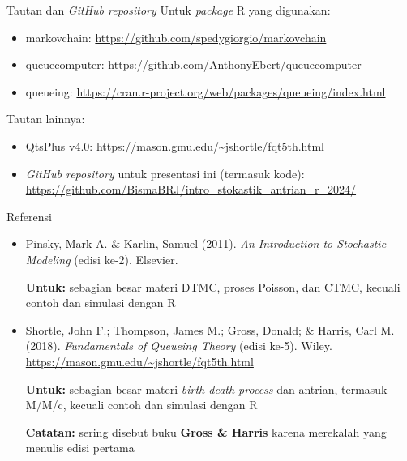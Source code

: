 \documentclass{beamer}
\begin{document}
\begin{frame}{Tautan dan \textit{GitHub repository}}
    Untuk \textit{package} R yang digunakan:
    \begin{itemize}
        \item markovchain: \url{https://github.com/spedygiorgio/markovchain}

        \item queuecomputer: \url{https://github.com/AnthonyEbert/queuecomputer}
        
        \item queueing: \url{https://cran.r-project.org/web/packages/queueing/index.html}
    \end{itemize}

    Tautan lainnya:

    \begin{itemize}
        \item QtsPlus v4.0: \url{https://mason.gmu.edu/~jshortle/fqt5th.html}
        
        \item \textit{GitHub repository} untuk presentasi ini (termasuk kode): \url{https://github.com/BismaBRJ/intro_stokastik_antrian_r_2024/}
    \end{itemize}
\end{frame}

\begin{frame}{Referensi}
    \begin{itemize}
        \item Pinsky, Mark A. \& Karlin, Samuel (2011). \textit{An Introduction to Stochastic Modeling} (edisi ke-2). Elsevier.
        
        \textbf{Untuk:} sebagian besar materi DTMC, proses Poisson, dan CTMC, kecuali contoh dan simulasi dengan R

        \item Shortle, John F.; Thompson, James M.; Gross, Donald; \& Harris, Carl M. (2018). \textit{Fundamentals of Queueing Theory} (edisi ke-5). Wiley. \url{https://mason.gmu.edu/~jshortle/fqt5th.html}
        
        \textbf{Untuk:} sebagian besar materi \textit{birth-death process} dan antrian, termasuk M/M/c, kecuali contoh dan simulasi dengan R

        \textbf{Catatan:} sering disebut buku \textbf{Gross \& Harris} karena merekalah yang menulis edisi pertama
    \end{itemize}
\end{frame}
\end{document}
